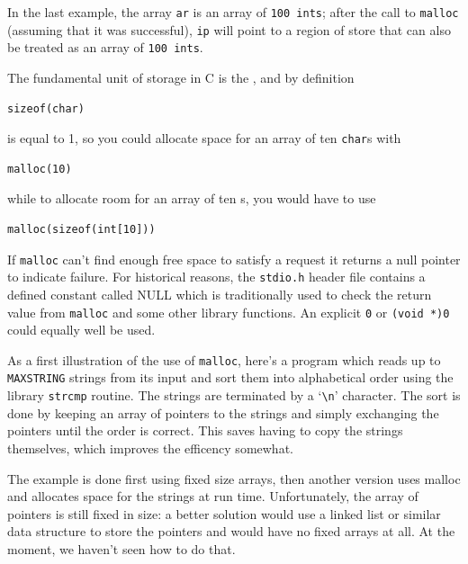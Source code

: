   In the last example, the array \texttt{ar} is an array of \texttt{100
   ints}; after the call to \texttt{malloc} (assuming that it was
   successful), \texttt{ip} will point to a region of store that can
   also be treated as an array of \texttt{100 ints}.


  The fundamental unit of storage in C is the \kchar, and by
   definition


  \begin{Verbatim}
sizeof(char)
\end{Verbatim}

  is equal to 1, so you could allocate space for an array of ten
   \texttt{char}s with


  \begin{Verbatim}
malloc(10)
\end{Verbatim}

  while to allocate room for an array of ten \kint{}s, you would
   have to use


  \begin{Verbatim}
malloc(sizeof(int[10]))
\end{Verbatim}

  If \texttt{malloc} can't find enough free space to satisfy
   a request it returns a null pointer to indicate failure. For historical
   reasons, the \texttt{stdio.h} header file contains a defined constant
   called NULL which is traditionally used to check the return value from
   \texttt{malloc} and some other library functions. An explicit
   \texttt{0} or \texttt{(void *)0} could equally well be used.


  As a first illustration of the use of \texttt{malloc}, here's
   a program which reads up to \texttt{MAXSTRING} strings from its input
   and sort them into alphabetical order using the library
   \texttt{strcmp} routine. The strings are terminated by
   a `\texttt{\textbackslash n}' character. The sort is done by keeping an array
   of pointers to the strings and simply exchanging the pointers until the
   order is correct. This saves having to copy the strings themselves, which
   improves the efficency somewhat.


  The example is done first using fixed size arrays, then another version
   uses malloc and allocates space for the strings at run time.
   Unfortunately, the array of pointers is still fixed in size: a better
   solution would use a linked list or similar data structure to store the
   pointers and would have no fixed arrays at all. At the moment, we haven't
   seen how to do that.


